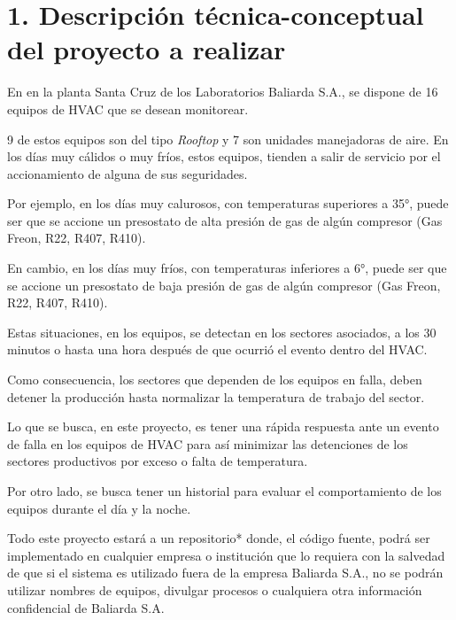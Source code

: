 \documentclass[
11pt, %
codirector, %
]{charter}
\begin{document}
\section{1. Descripción técnica-conceptual del proyecto a realizar}
\label{sec:descripcion}


En en la planta Santa Cruz de los Laboratorios Baliarda S.A., se dispone de 16 equipos de HVAC que se desean monitorear.\par 
9 de estos equipos son del tipo \textit{Rooftop} y 7 son unidades manejadoras de aire.
 En los días muy cálidos o muy fríos, estos equipos, tienden a salir de servicio por el accionamiento de alguna de sus seguridades. \par 
Por ejemplo, en los días muy calurosos, con temperaturas superiores a 35°, puede ser que se accione un presostato de alta presión de gas de algún compresor (Gas Freon, R22, R407, R410). \par 
En cambio, en los días muy fríos, con temperaturas inferiores a 6°, puede ser que se accione un presostato de baja presión de gas de algún compresor (Gas Freon, R22, R407, R410). \par 
 Estas situaciones, en los equipos, se detectan en los sectores asociados, a los 30 minutos o hasta una hora después de que ocurrió el evento dentro del HVAC. \par 
Como consecuencia, los sectores que dependen de los equipos en falla, deben detener la producción hasta normalizar la temperatura de trabajo del sector. \par 
 Lo que se busca, en este proyecto, es tener una rápida respuesta ante un evento de falla en los equipos de HVAC para así minimizar las detenciones de los sectores productivos por exceso o falta de temperatura. \par 
Por otro lado, se busca tener un historial para evaluar el comportamiento de los equipos durante el día y la noche.\par 
Todo este proyecto estará a un repositorio* donde, el código fuente, podrá ser implementado en cualquier empresa o institución que lo requiera con la salvedad de que si el sistema es utilizado fuera de la empresa Baliarda S.A., no se podrán utilizar nombres de equipos, divulgar procesos o cualquiera otra información confidencial de Baliarda S.A. \par 
\end{document}
